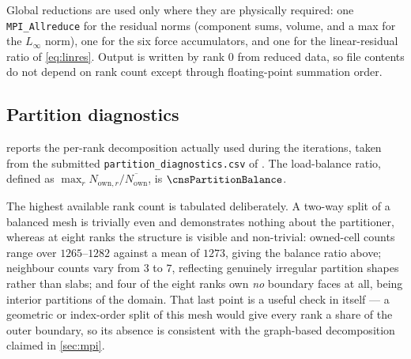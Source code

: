 Global reductions are used only where they are physically required: one
\texttt{MPI\_Allreduce} for the residual norms (component sums, volume, and a max
for the $L_\infty$ norm), one for the six force accumulators, and one for the
linear-residual ratio of \cref{eq:linres}. Output is written by rank 0 from
reduced data, so file contents do not depend on rank count except through
floating-point summation order.

\subsection{Partition diagnostics}

 reports the per-rank decomposition actually used during the
iterations, taken from the submitted \texttt{partition\_diagnostics.csv} of
\cnsPartitionCase. The load-balance ratio, defined as
$\max_r N_{\mathrm{own},r}/\overline{N_{\mathrm{own}}}$, is
$\cnsPartitionBalance$.

The highest available rank count is tabulated deliberately. A two-way split of a
balanced mesh is trivially even and demonstrates nothing about the partitioner, whereas
at eight ranks the structure is visible and non-trivial: owned-cell counts range over
$1265$--$1282$ against a mean of $1273$, giving the balance ratio above; neighbour
counts vary from $3$ to $7$, reflecting genuinely irregular partition shapes rather than
slabs; and four of the eight ranks own \emph{no} boundary faces at all, being interior
partitions of the domain. That last point is a useful check in itself --- a geometric
or index-order split of this mesh would give every rank a share of the outer boundary,
so its absence is consistent with the graph-based decomposition claimed in
\cref{sec:mpi}.

\begin{table}[htbp]
  \centering
  \caption{Per-rank partition diagnostics for \cnsPartitionCase{}, from the
  submitted \texttt{partition\_diagnostics.csv}. Send and receive counts are the
  number of cell records moved per halo exchange. Send and receive counts differ by
  rank because the halo relationship is not symmetric in cell count: a rank may need
  more cells from its neighbours than they need from it.}
  \label{tab:partition}
  \small
  
\end{table}
